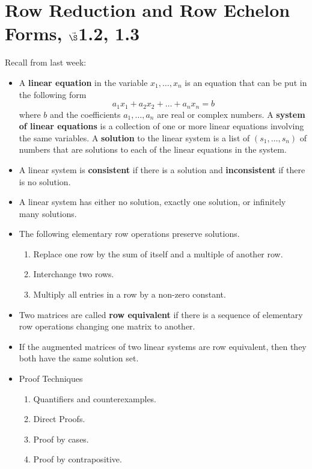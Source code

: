 


%


\section{{Row Reduction and Row Echelon Forms, $\vec\S$1.2,  1.3}}%
% 

%
\thispagestyle{fancy}

Recall from last week:

\begin{itemize}

\item A {\bf linear equation} in the variable $x_1, \dots, x_n$ is an equation that can be put in the following form
\begin{equation*}
a_1 x_1 +a_2 x_2 +\dots + a_n x_n =b
\end{equation*}
where $b$ and the coefficients $a_1,\dots, a_n$ are real or complex numbers. A {\bf system of linear equations} is a collection of one or more linear equations involving the same variables. A {\bf solution} to the linear system is a list of $(s_1, \dots, s_n)$ of numbers that are solutions to each of the linear equations in the system. 

\item A linear system is {\bf consistent} if there is a solution and {\bf inconsistent} if there is no solution.

\item A linear system has either no solution, exactly one solution, or infinitely many solutions.

\item The following elementary row operations preserve solutions.
\begin{enumerate}
\item Replace one row by the sum of itself and a multiple of another row.
\item Interchange two rows.
\item Multiply all entries in a row by a non-zero constant.
\end{enumerate}

\item Two matrices are called {\bf row equivalent} if there is a sequence of elementary row operations changing one matrix to another.

\item If the augmented matrices of two linear systems are row equivalent, then they both have the same solution set. 

\item Proof Techniques
\begin{enumerate}
\item Quantifiers and counterexamples.
\item Direct Proofs.
\item Proof by cases.
\item Proof by contrapositive.
\end{enumerate}


\end{itemize}

